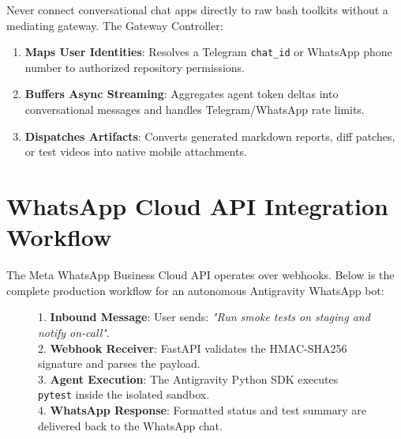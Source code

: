 \documentclass[11pt,a4paper,oneside]{book}
\begin{document}
\begin{conceptbox}
Never connect conversational chat apps directly to raw bash toolkits without a mediating gateway. The Gateway Controller:
\begin{enumerate}
    \item \textbf{Maps User Identities}: Resolves a Telegram \texttt{chat\_id} or WhatsApp phone number to authorized repository permissions.
    \item \textbf{Buffers Async Streaming}: Aggregates agent token deltas into conversational messages and handles Telegram/WhatsApp rate limits.
    \item \textbf{Dispatches Artifacts}: Converts generated markdown reports, diff patches, or test videos into native mobile attachments.
\end{enumerate}
\end{conceptbox}

\section{WhatsApp Cloud API Integration Workflow}
The Meta WhatsApp Business Cloud API operates over webhooks. Below is the complete production workflow for an autonomous Antigravity WhatsApp bot:

\begin{figure}[htbp]
\centering
\begin{conceptbox}
1. \textbf{Inbound Message}: User sends: \textit{"Run smoke tests on staging and notify on-call"}.\\
2. \textbf{Webhook Receiver}: FastAPI validates the HMAC-SHA256 signature and parses the payload.\\
3. \textbf{Agent Execution}: The Antigravity Python SDK executes \texttt{pytest} inside the isolated sandbox.\\
4. \textbf{WhatsApp Response}: Formatted status and test summary are delivered back to the WhatsApp chat.
\end{conceptbox}
\end{figure}
\end{document}
